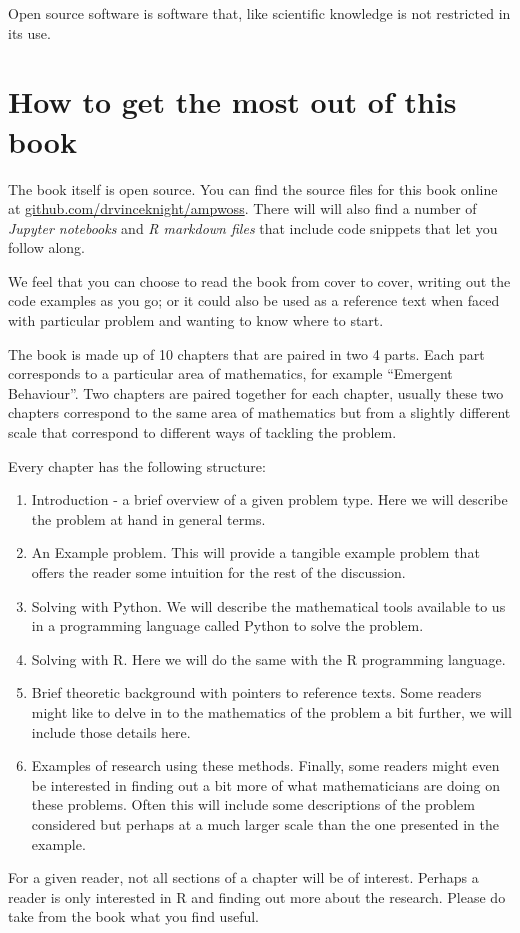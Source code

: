 Open source software is software that, like scientific knowledge is not
restricted in its use.

\section{How to get the most out of this
book}\label{sec:how-to-get-the-most-out-of-this-book}

The book itself is open source. You can find the source files for this
book online at \url{github.com/drvinceknight/ampwoss}. There will will
also find a number of \emph{Jupyter notebooks} and \emph{R markdown
files} that include code snippets that let you follow along.

We feel that you can choose to read the book from cover to cover,
writing out the code examples as you go; or it could also be used as a
reference text when faced with particular problem and wanting to know
where to start.

The book is made up of 10 chapters that are paired in two 4 parts. Each
part corresponds to a particular area of mathematics, for example
``Emergent Behaviour''. Two chapters are paired together for each
chapter, usually these two chapters correspond to the same area of
mathematics but from a slightly different scale that correspond to
different ways of tackling the problem.

Every chapter has the following structure:

\begin{enumerate}
\item
  Introduction - a brief overview of a given problem type. Here we will
  describe the problem at hand in general terms.
\item
  An Example problem. This will provide a tangible example problem that
  offers the reader some intuition for the rest of the discussion.
\item
  Solving with Python. We will describe the mathematical tools available
  to us in a programming language called Python to solve the problem.
\item
  Solving with R. Here we will do the same with the R programming
  language.
\item
  Brief theoretic background with pointers to reference texts. Some
  readers might like to delve in to the mathematics of the problem a bit
  further, we will include those details here.
\item
  Examples of research using these methods. Finally, some readers might
  even be interested in finding out a bit more of what mathematicians
  are doing on these problems. Often this will include some descriptions
  of the problem considered but perhaps at a much larger scale than the
  one presented in the example.
\end{enumerate}

For a given reader, not all sections of a chapter will be of interest.
Perhaps a reader is only interested in R and finding out more about the
research. Please do take from the book what you find useful.
